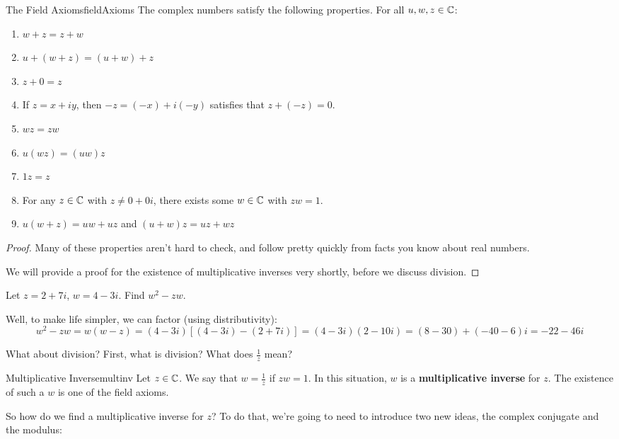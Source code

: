 \begin{thmbo}{The Field Axioms}{fieldAxioms}
The complex numbers satisfy the following properties. For all $u, w, z \in \mathbb{C}$:

\begin{enumerate}
\item  $w + z = z + w$
\item  $u + (w + z) = (u+ w) + z$
\item  $z + 0 = z$
\item If $z = x + iy$, then $-z = (-x) + i(-y)$ satisfies that $z + (-z) = 0$.
\item $wz = zw$
\item $u(wz) = (uw)z$
\item $1z = z$
\item For any $z\in \mathbb{C}$ with $z\ne 0 + 0i$, there exists some $w\in \mathbb{C}$ with $zw = 1$. 
\item $u(w+z) = uw + uz$ and $(u+w)z= uz + wz$
\end{enumerate}
\end{thmbo}

\begin{proof} Many of these properties aren't hard to check, and follow pretty quickly from facts you know about real numbers.

We will provide a proof for the existence of multiplicative inverses very shortly, before we discuss division. \end{proof}

\begin{ex}{}{} Let $z = 2 + 7i$, $w = 4 - 3i$. Find $w^2 - zw$.

Well, to make life simpler, we can factor (using distributivity):
$$w^2 - zw = w(w-z) = (4-3i)[(4-3i) - (2 + 7i)] = (4-3i)(2 - 10i) = (8 - 30) + (-40 - 6)i = -22 - 46i$$

\end{ex}

What about division? First, what is division? What does $\frac{1}{z}$ mean? 

\begin{defbo}{Multiplicative Inverse}{multinv}
Let $z\in \mathbb{C}$. We say that $w = \frac{1}{z}$ if $zw =1$. In this situation, $w$ is a {\bf multiplicative inverse} for $z$. The existence of such a $w$ is one of the field axioms.
\end{defbo}

So how do we find a multiplicative inverse for $z$? To do that, we're going to need to introduce two new ideas, the complex conjugate and the modulus:

